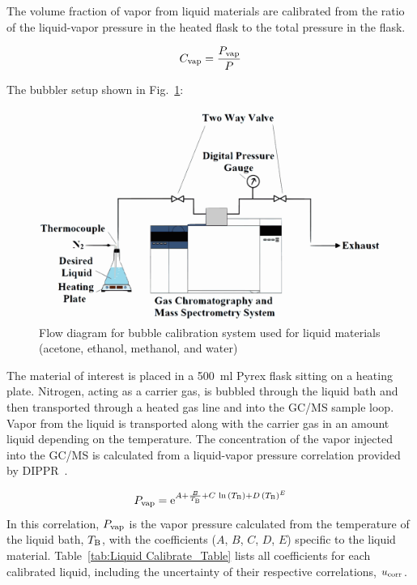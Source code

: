 \documentclass[12pt]{article}
\begin{document}
The volume fraction of vapor from liquid materials are calibrated from the ratio of the liquid-vapor pressure in the heated flask to the total pressure in the flask.

\begin{equation}
\label{eq:liquid_vapor_concentration}
C_{\rm vap} =\frac {P_{\rm vap}}{P}
\end{equation}

The bubbler setup shown in Fig.~\ref{fig:Bubbler}:

\begin{figure}[h!]
	\centering
\includegraphics[width=\textwidth,keepaspectratio]{Bubbler_Setup.png}
	\caption[Flow diagram for bubble calibration system used for liquid materials]{Flow diagram for bubble calibration system used for liquid materials (acetone, ethanol, methanol, and water)}
	\label{fig:Bubbler}
\end{figure}
The material of interest is placed in a 500~ml Pyrex flask sitting on a heating plate. Nitrogen, acting as a carrier gas, is bubbled through the liquid bath and then transported through a heated gas line and into the GC/MS sample loop. Vapor from the liquid is transported along with the carrier gas in an amount liquid depending on the temperature. The concentration of the vapor injected into the GC/MS is calculated from a liquid-vapor pressure correlation provided by DIPPR~\cite{Dippr}.

\begin{equation}
\label{eq:liquid_vapor_pressure_correlation}
P_{\rm vap} ={\rm e}^{A+\frac{B}{T_{\rm B}}+C\,\ln{(T_{\rm B})}+D\,(T_{\rm B})^{E}}
\end{equation}
In this correlation, $P_{\rm vap}$ is the vapor pressure calculated from the temperature of the liquid bath, $T_{\rm B}$, with the coefficients ($A$, $B$, $C$, $D$, $E$) specific to the liquid material. Table~\ref{tab:Liquid Calibrate_Table} lists all coefficients for each calibrated liquid, including the uncertainty of their respective correlations, $u_{\rm corr}$.
\end{document}
